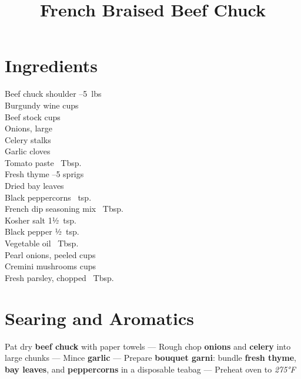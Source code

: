 \documentclass[11pt,letterpaper]{article}
\title{French Braised Beef Chuck}
\author{}
\date{}
\begin{document}
\maketitle
\thispagestyle{empty}

\section*{Ingredients}
\setlength{\columnsep}{20pt}
\begin{multicols}{2}
\noindent
    Beef chuck shoulder --5~lbs \\
    Burgundy wine  cups \\
    Beef stock  cups \\
    Onions, large  \\
    Celery stalks  \\
    Garlic cloves  \\
    Tomato paste ~Tbsp. \\
    Fresh thyme --5 sprigs \\
	\columnbreak
    Dried bay leaves  \\
    Black peppercorns ~tsp. \\
    French dip seasoning mix ~Tbsp. \\
    Kosher salt \dotfill 1½~tsp. \\
    Black pepper \dotfill ½~tsp. \\
    Vegetable oil ~Tbsp. \\
    Pearl onions, peeled  cups \\
    Cremini mushrooms  cups \\
    Fresh parsley, chopped ~Tbsp. \\
\end{multicols}

\section*{Searing and Aromatics}

\noindent
Pat dry \textbf{beef chuck} with paper towels ---
Rough chop \textbf{onions} and \textbf{celery} into large chunks ---
Mince \textbf{garlic} ---
Prepare \textbf{bouquet garni}: bundle \textbf{fresh thyme}, \textbf{bay leaves}, and \textbf{peppercorns} in a disposable teabag ---
Preheat oven to \textit{275°F}
\end{document}

